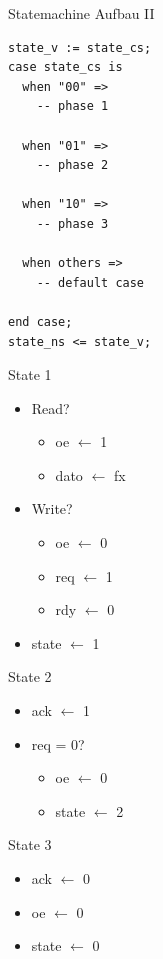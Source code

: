 \documentclass[aspectratio=169,presentation]{beamer}
\begin{document}
\begin{frame} [fragile] {Statemachine Aufbau II}
  \vspace{-.7cm}
  \begin{lstlisting}
state_v := state_cs;
case state_cs is
  when "00" =>
    -- phase 1

  when "01" =>
    -- phase 2

  when "10" =>
    -- phase 3

  when others =>
    -- default case
    
end case;
state_ns <= state_v;
  \end{lstlisting}
\end{frame}


\begin{frame} {State 1}
  \begin{itemize}
    \item Read?
    \begin{itemize}
      \item oe $\leftarrow$ 1
      \item dato $\leftarrow$ fx
    \end{itemize}
    \item Write?
    \begin{itemize}
      \item oe $\leftarrow$ 0
      \item req $\leftarrow$ 1
      \item rdy $\leftarrow$ 0
    \end{itemize}
    \item state $\leftarrow$ 1
  \end{itemize}
\end{frame}


\begin{frame} {State 2}
  \begin{itemize}
    \item ack $\leftarrow$ 1
    \item req = 0?
    \begin{itemize}
      \item oe $\leftarrow$ 0
      \item state $\leftarrow$ 2
    \end{itemize}
  \end{itemize}
\end{frame}


\begin{frame} {State 3}
  \begin{itemize}
    \item ack $\leftarrow$ 0
    \item oe $\leftarrow$ 0
    \item state $\leftarrow$ 0
  \end{itemize}
\end{frame}
\end{document}
